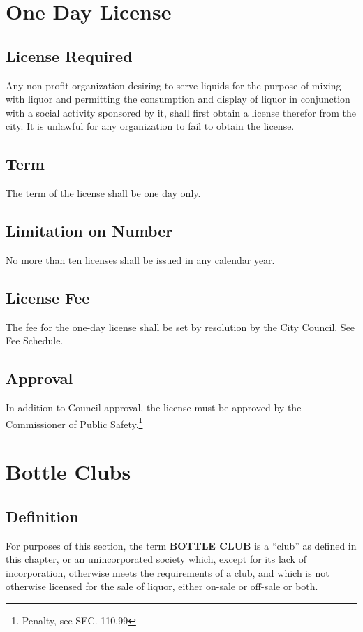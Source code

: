 
\setcounter{section}{114}
\section{One Day License}
\subsection{License Required}
Any non-profit organization desiring to serve liquids for the purpose of mixing with liquor and permitting the consumption and display of liquor in conjunction with a social activity sponsored by it, shall first obtain a license therefor from the city. It is unlawful for any organization to fail to obtain the license.
\subsection{Term}
The term of the license shall be one day only.
\subsection{Limitation on Number}
No more than ten licenses shall be issued in any calendar year.
\subsection{License Fee}
The fee for the one-day license shall be set by resolution by the City Council. See Fee Schedule.
\subsection{Approval}
In addition to Council approval, the license must be approved by the Commissioner of Public Safety.\footnote{Penalty, see SEC. 110.99}

\section{Bottle Clubs}
\subsection{Definition}
For purposes of this section, the term \textbf{BOTTLE CLUB} is a “club” as defined in this chapter, or an unincorporated society which, except for its lack of incorporation, otherwise meets the requirements of a club, and which is not otherwise licensed for the sale of liquor, either on-sale or off-sale or both.
